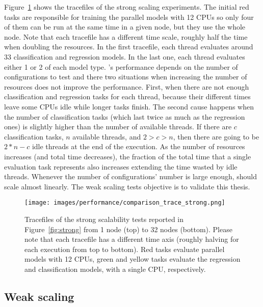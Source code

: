 Figure~\ref{fig:traces_strong} shows the tracefiles of the strong scaling experiments. The initial red tasks are responsible for training the parallel models with 12 CPUs so only four of them can be run at the same time in a given node, but they use the whole node. Note that each tracefile has a different time scale, roughly half the time when doubling the resources. In the first tracefile, each thread evaluates around 33 classification and regression models. In the last one, each thread evaluates either 1 or 2 of each model type.
\HPCsys's performance depends on the number of configurations to test and there two situations when increasing the number of resources does not improve the performance. First, when there are not enough classification and regression tasks for each thread, because their different times leave some CPUs idle while longer tasks finish. The second cause happens when the number of classification tasks (which last twice as much as the regression ones) is slightly higher than the number of available threads. If there are $c$ classification tasks, $n$ available threads, and $2 > c > n$, then there are going to be $2*n - c$ idle threads at the end of the execution. As the number of resources increases (and total time decreases), the fraction of the total time that a single evaluation task represents also increases extending the time wasted by idle threads. Whenever the number of configurations' number is large enough, 
\HPCsys should scale almost linearly. The weak scaling tests objective is to validate this thesis.


\begin{figure}
    \centering
    \texttt{[image: images/performance/comparison\_trace\_strong.png]}
    \caption{\small Tracefiles of the strong scalability tests reported in Figure~\ref{fig:strong}  from 1 node (top) to 32 nodes (bottom). Please note that each tracefile has a different time axis (roughly halving for each execution from top to bottom). Red tasks evaluate parallel models with 12 CPUs, green and yellow tasks evaluate the regression and classification models, with a single CPU, respectively.}
    \label{fig:traces_strong}
\end{figure}

\subsection{Weak scaling}

